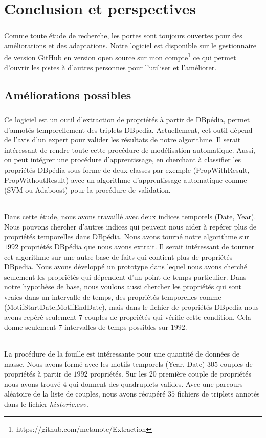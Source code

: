 \documentclass[12pt,a4	]{report}
\begin{document}
\chapter{Conclusion et perspectives}
\paragraph{}
Comme toute étude de recherche, les portes sont toujours ouvertes pour des améliorations et des adaptations. Notre logiciel est disponible sur le gestionnaire de version GitHub en version open source sur mon compte\footnote{https://github.com/metanote/Extraction} ce qui permet d'ouvrir les pistes à d'autres personnes pour l'utiliser et l'améliorer. 
\section*{Améliorations possibles}
\paragraph{}
Ce logiciel est un outil d'extraction de propriétés à partir de DBpédia, permet d'annotés temporellement des triplets DBpedia. Actuellement, cet outil dépend de l'avis d'un expert pour valider les résultats de notre algorithme. Il serait intéressant de rendre toute cette procédure de modélisation automatique. Aussi, on peut intégrer une procédure d'apprentissage, en cherchant à classifier les propriétés DBpédia sous forme de deux classes par exemple (PropWithResult, PropWithoutResult) avec un algorithme d'apprentissage automatique comme (SVM ou Adaboost) pour la procédure de validation.
\subparagraph{}
Dans cette étude, nous avons travaillé avec deux indices temporels (Date, Year). Nous pouvons chercher d'autres indices qui peuvent nous aider à repérer plus de propriétés temporelles dans DBpédia. Nous avons tourné notre algorithme sur $1992$ propriétés DBpédia que nous avons extrait. Il serait intéressant de tourner cet algorithme sur une autre base de faits qui contient plus de propriétés DBpedia.
Nous avons développé un prototype dans lequel nous avons cherché seulement les propriétés qui dépendent d'un point de temps particulier.
Dans notre hypothèse de base, nous voulons aussi chercher les propriétés qui sont vraies dans un intervalle de temps, des propriétés temporelles comme (MotifStartDate,MotifEndDate), mais dans le fichier de propriétés DBpedia nous avons repéré seulement $7$ couples de propriétés qui vérifie cette condition. Cela donne seulement $7$ intervalles de temps possibles sur $1992$.
\subparagraph{}
La procédure de la fouille est intéressante pour une quantité de données de masse. Nous avons formé avec les motifs temporels (Year, Date) $305$ couples de propriétés à partir de $1992$ propriétés. Sur les $20$ première couple de propriétés nous avons trouvé $4$ qui donnent des quadruplets valides. Avec une parcours aléatoire de la liste de couples, nous avons récupéré $35$ fichiers de triplets annotés dans le fichier $historic.csv$.
\end{document}
